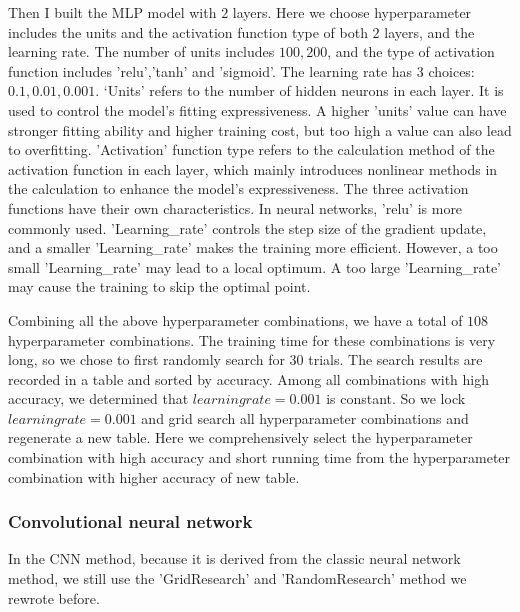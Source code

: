 Then I built the MLP model with $2$ layers. Here we choose hyperparameter includes the units and the activation function type of both $2$ layers, and the learning rate. The number of units includes $100,200$, and the type of activation function includes 'relu','tanh' and 'sigmoid'. The learning rate has $3$ choices: $0.1,0.01, 0.001$. ‘Units' refers to the number of hidden neurons in each layer. It is used to control the model's fitting expressiveness. A higher 'units' value can have stronger fitting ability and higher training cost, but too high a value can also lead to overfitting. 'Activation' function type refers to the calculation method of the activation function in each layer, which mainly introduces nonlinear methods in the calculation to enhance the model's expressiveness. The three activation functions have their own characteristics. In neural networks, 'relu' is more commonly used. 'Learning\_rate' controls the step size of the gradient update, and a smaller 'Learning\_rate' makes the training more efficient. However, a too small 'Learning\_rate' may lead to a local optimum. A too large 'Learning\_rate' may cause the training to skip the optimal point.

Combining all the above hyperparameter combinations, we have a total of $108$ hyperparameter combinations. The training time for these combinations is very long, so we chose to first randomly search for $30$ trials. The search results are recorded in a table and sorted by accuracy. Among all combinations with high accuracy, we determined that $learning rate = 0.001$ is constant. So we lock $learning rate = 0.001$ and grid search all hyperparameter combinations and regenerate a new table. Here we comprehensively select the hyperparameter combination with high accuracy and short running time from the hyperparameter combination with higher accuracy of new table.

\subsubsection{Convolutional neural network}

\indent

In the CNN method, because it is derived from the classic neural network method, we still use the 'GridResearch' and 'RandomResearch' method we rewrote before.

